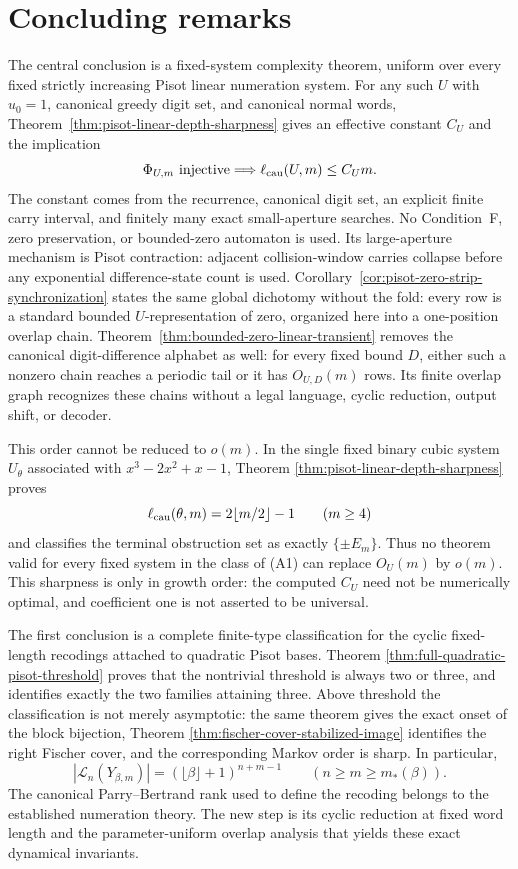 \section{Concluding remarks}\label{sec:discussion}

The central conclusion is a fixed-system complexity theorem, uniform over
every fixed strictly increasing Pisot linear numeration system.  For any such
$U$ with $u_0=1$, canonical greedy digit set, and canonical normal words,
Theorem~\ref{thm:pisot-linear-depth-sharpness} gives an effective constant
$C_U$ and the implication
\[
\Phi_{U,m}\text{ injective}\Longrightarrow
\ell_{\rm cau}(U,m)\le C_Um.
\]
The constant comes from the recurrence, canonical digit set, an explicit
finite carry interval, and finitely many exact small-aperture searches.  No
Condition~F, zero preservation, or bounded-zero automaton is used.  Its
large-aperture mechanism is Pisot contraction: adjacent collision-window
carries collapse before any exponential difference-state count is used.
Corollary~\ref{cor:pisot-zero-strip-synchronization} states the same global
dichotomy without the fold: every row is a standard bounded
$U$-representation of zero, organized here into a one-position overlap
chain.  Theorem~\ref{thm:bounded-zero-linear-transient} removes the canonical
digit-difference alphabet as well: for every fixed bound $D$, either such a
nonzero chain reaches a periodic tail or it has $O_{U,D}(m)$ rows.  Its
finite overlap graph recognizes these chains without a legal language,
cyclic reduction, output shift, or decoder.

This order cannot be reduced to $o(m)$.  In the single fixed binary cubic
system $U_\theta$ associated with $x^3-2x^2+x-1$, Theorem
\ref{thm:pisot-linear-depth-sharpness} proves
\[
\ell_{\rm cau}(\theta,m)=2\lfloor m/2\rfloor-1\qquad(m\ge4)
\]
and classifies the terminal obstruction set as exactly $\{\pm E_m\}$.
Thus no theorem valid for every fixed system in the class of \textup{(A1)}
can replace $O_U(m)$ by $o(m)$.  This sharpness is only in growth order: the
computed $C_U$ need not be numerically optimal, and coefficient one is not
asserted to be universal.

The first conclusion is a complete finite-type classification for the cyclic
fixed-length recodings attached to quadratic Pisot bases.  Theorem
\ref{thm:full-quadratic-pisot-threshold} proves that the nontrivial threshold
is always two or three, and identifies exactly the two families attaining
three.  Above threshold the classification is not merely asymptotic: the
same theorem gives the exact onset of the block bijection, Theorem
\ref{thm:fischer-cover-stabilized-image}
identifies the right Fischer cover, and the corresponding Markov order is
sharp.  In particular,
\[
 |\mathcal L_n(Y_{\beta,m})|
 =(\lfloor\beta\rfloor+1)^{n+m-1}
 \qquad(n\ge m\ge m_*(\beta)).
\]
The canonical Parry--Bertrand rank used to define the recoding belongs to
the established numeration theory.  The new step is its cyclic reduction at
fixed word length and the parameter-uniform overlap analysis that yields
these exact dynamical invariants.

